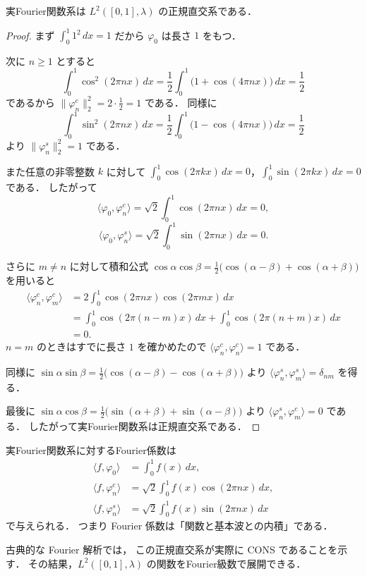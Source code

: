 \begin{proposition}
実Fourier関数系は $L^2([0,1],\lambda)$ の正規直交系である．
\end{proposition}
\begin{proof}
まず
$\int_0^1 1^2\,dx=1$ だから $\varphi_0$ は長さ $1$ をもつ．

次に $n\ge 1$ とすると
\[
\int_0^1 \cos^2(2\pi n x)\,dx
=
\frac12\int_0^1 \bigl(1+\cos(4\pi n x)\bigr)\,dx
=
\frac12
\]
であるから
$\|\varphi_n^c\|_2^2=2\cdot \frac12=1$ である．
同様に
\[
\int_0^1 \sin^2(2\pi n x)\,dx
=
\frac12\int_0^1 \bigl(1-\cos(4\pi n x)\bigr)\,dx
=
\frac12
\]
より
$\|\varphi_n^s\|_2^2=1$ である．

また任意の非零整数 $k$ に対して
$\int_0^1 \cos(2\pi kx)\,dx=0$，$\int_0^1 \sin(2\pi kx)\,dx=0$ である．
したがって
\[
\langle \varphi_0,\varphi_n^c\rangle
=
\sqrt{2}\int_0^1 \cos(2\pi n x)\,dx
=0,
\]
\[
\langle \varphi_0,\varphi_n^s\rangle
=
\sqrt{2}\int_0^1 \sin(2\pi n x)\,dx
=0.
\]

さらに $m\ne n$ に対して積和公式
$\cos \alpha \cos \beta=\frac12\bigl(\cos(\alpha-\beta)+\cos(\alpha+\beta)\bigr)$ を用いると
\begin{align*}
\langle \varphi_n^c,\varphi_m^c\rangle
&=
2\int_0^1 \cos(2\pi n x)\cos(2\pi m x)\,dx \\
&=
\int_0^1 \cos(2\pi(n-m)x)\,dx
+
\int_0^1 \cos(2\pi(n+m)x)\,dx \\
&=0.
\end{align*}
$n=m$ のときはすでに長さ $1$ を確かめたので
$\langle \varphi_n^c,\varphi_n^c\rangle=1$ である．

同様に
$\sin \alpha \sin \beta=\frac12\bigl(\cos(\alpha-\beta)-\cos(\alpha+\beta)\bigr)$ より
$\langle \varphi_n^s,\varphi_m^s\rangle=\delta_{nm}$ を得る．

最後に
$\sin \alpha \cos \beta=\frac12\bigl(\sin(\alpha+\beta)+\sin(\alpha-\beta)\bigr)$ より
$\langle \varphi_n^s,\varphi_m^c\rangle=0$ である．
したがって実Fourier関数系は正規直交系である．
\end{proof}

\begin{remark}
実Fourier関数系に対するFourier係数は
\[
\begin{aligned}
\langle f,\varphi_0\rangle&=\int_0^1 f(x)\,dx,\\
\langle f,\varphi_n^c\rangle&=\sqrt{2}\int_0^1 f(x)\cos(2\pi n x)\,dx,\\
\langle f,\varphi_n^s\rangle&=\sqrt{2}\int_0^1 f(x)\sin(2\pi n x)\,dx
\end{aligned}
\]
で与えられる．
つまり Fourier 係数は「関数と基本波との内積」である．

古典的な Fourier 解析では，
この正規直交系が実際に CONS であることを示す．
その結果，$L^2([0,1],\lambda)$ の関数をFourier級数で展開できる．
\end{remark}


